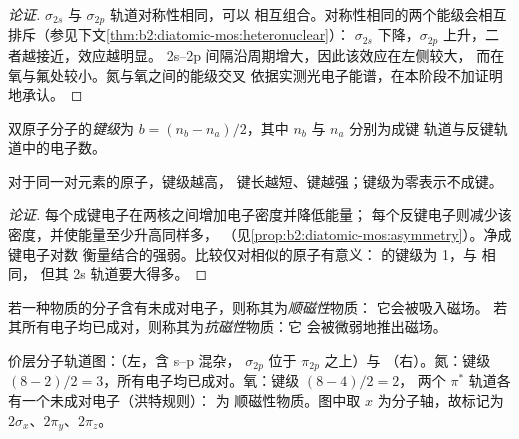 \begin{proof}[论证]
$\sigma_{2s}$ 与 $\sigma_{2p}$ 轨道对称性相同，可以
相互组合。对称性相同的两个能级会相互排斥（参见下文\cref{thm:b2:diatomic-mos:heteronuclear}）：
$\sigma_{2s}$ 下降，$\sigma_{2p}$ 上升，二者越接近，效应越明显。
2s--2p 间隔沿周期增大，因此该效应在左侧较大，
而在氧与氟处较小。氮与氧之间的能级交叉
依据实测光电子能谱，在本阶段不加证明地承认。
\end{proof}

\begin{definition}[键级]\label{def:b2:diatomic-mos:bond-order}
双原子分子的\emph{键级}为 $b = (n_b -
n_a)/2$，其中 $n_b$ 与 $n_a$ 分别为成键
轨道与反键轨道中的电子数。
\end{definition}

\begin{proposition}[键级与键]\label{prop:b2:diatomic-mos:bond-order}
对于同一对元素的原子，键级越高，
键长越短、键越强；键级为零表示不成键。
\end{proposition}

\begin{proof}[论证]
每个成键电子在两核之间增加电子密度并降低能量；
每个反键电子则减少该密度，并使能量至少升高同样多，
（见\cref{prop:b2:diatomic-mos:asymmetry}）。净成键电子对数
衡量结合的强弱。比较仅对相似的原子有意义： 的键级为 1，与  相同，
但其 2s 轨道要大得多。
\end{proof}

\begin{definition}[顺磁性与抗磁性]\label{def:b2:diatomic-mos:magnetism}
若一种物质的分子含有未成对电子，则称其为\emph{顺磁性}物质：
它会被吸入磁场。
若其所有电子均已成对，则称其为\emph{抗磁性}物质：它
会被微弱地推出磁场。
\end{definition}

\begin{omfigure}
\begin{MOdiagram}[names, labels, style=square, distance=4.2cm, labels-fs=\scriptsize]
\end{MOdiagram}
\hfill
\begin{MOdiagram}[names, labels, style=square, distance=4.2cm, labels-fs=\scriptsize]
\end{MOdiagram}

{\small 价层分子轨道图：（左，含 s--p 混杂，
$\sigma_{2p}$ 位于 $\pi_{2p}$ 之上）与 （右）。氮：键级
$(8 - 2)/2 = 3$，所有电子均已成对。氧：键级 $(8 - 4)/2 = 2$，
两个 $\pi^*$ 轨道各有一个未成对电子（洪特规则）： 为
顺磁性物质。图中取 $x$ 为分子轴，故标记为
$2\sigma_x$、$2\pi_y$、$2\pi_z$。}
\end{omfigure}

